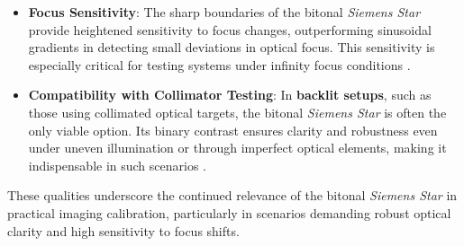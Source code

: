 \documentclass[main]{subfiles}
\begin{document}
  \begin{itemize}
    \item \textbf{Focus Sensitivity}: The sharp boundaries of the bitonal \textit{Siemens Star} provide heightened sensitivity to focus changes, outperforming sinusoidal gradients in detecting small deviations in optical focus. This sensitivity is especially critical for testing systems under infinity focus conditions \cite{Loebich2007_SiemensStar,EdmundOptics}.
    \item \textbf{Compatibility with Collimator Testing}: In \textbf{backlit setups}, such as those using collimated optical targets, the bitonal \textit{Siemens Star} is often the only viable option. Its binary contrast ensures clarity and robustness even under uneven illumination or through imperfect optical elements, making it indispensable in such scenarios \cite{Burns2014_ImagingHandbook}.
  \end{itemize}

  These qualities underscore the continued relevance of the bitonal \textit{Siemens Star} in practical imaging calibration, particularly in scenarios demanding robust optical clarity and high sensitivity to focus shifts.





\end{document}
